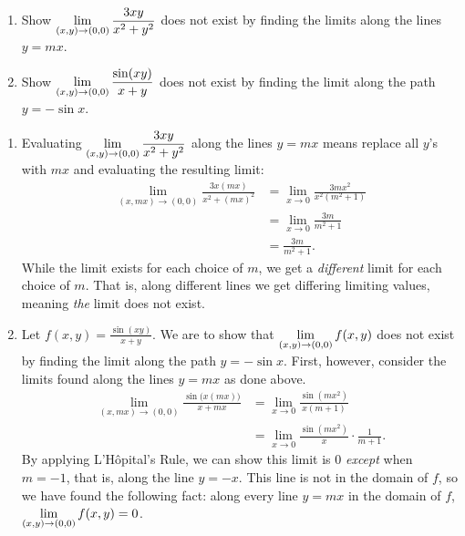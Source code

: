 

\begin{example}\label{ex_multilimit4}%
\mbox{}\\[-2\baselineskip]\parbox[t]{\linewidth}{\begin{enumerate}
	\item Show $\displaystyle \lim_{(x,y)\to (0,0)} \frac{3xy}{x^2+y^2}$ does not exist by finding the limits along the lines $y=mx$.
	\item	Show $\displaystyle \lim_{(x,y)\to (0,0)} \frac{\sin(xy)}{x+y}$ does not exist by finding the limit along the path $y=-\sin x$. 	
\end{enumerate}}\vspace{0pt}
\solution
\begin{enumerate}
	\item Evaluating $\displaystyle \lim_{(x,y)\to (0,0)} \frac{3xy}{x^2+y^2}$ along the lines $y=mx$ means replace all $y$'s with $mx$ and evaluating the resulting limit:
	\begin{align*}
	\lim_{(x,mx)\to (0,0)} \frac{3x(mx)}{x^2+(mx)^2} &=\lim_{x\to 0} \frac{3mx^2}{x^2(m^2+1)}\\
				&= \lim_{x\to 0} \frac{3m}{m^2+1}\\
				&= \frac{3m}{m^2+1}.
	\end{align*}
	While the limit exists for each choice of $m$, we get a \emph{different} limit for each choice of $m$. That is, along different lines we get differing limiting values, meaning \emph{the} limit does not exist.
	
	\item		Let $f(x,y) = \frac{\sin(xy)}{x+y}$. We are to show that $\displaystyle \lim_{(x,y)\to (0,0)} f(x,y)$ does not exist by finding the limit along the path $y=-\sin x$. First, however, consider the limits found along the lines $y=mx$ as done above.
	\begin{align*}
	\lim_{(x,mx)\to (0,0)} \frac{\sin\bigl(x(mx)\bigr)}{x+mx} &= \lim_{x\to 0} \frac{\sin (mx^2)}{x(m+1)} \\
	&= \lim_{x\to 0} \frac{\sin(mx^2)}{x}\cdot\frac1{m+1}.
	\end{align*}
	By applying L'Hôpital's Rule, we can show this limit is 0 \emph{except} when $m=-1$, that is, along the line $y=-x$. This line is not in the domain of $f$, so we have found the following fact: along every line $y=mx$ in the domain of $f$, $\displaystyle \lim_{(x,y)\to(0,0)} f(x,y)=0$. %
	

\end{enumerate}
\end{example}
